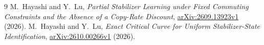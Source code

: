 \documentclass[10pt]{amsart}
\begin{document}
\begin{thebibliography}{9}
M.~Hayashi and Y.~Lu,
\emph{Partial Stabilizer Learning under Fixed Commuting Constraints and the
Absence of a Copy-Rate Discount},
\href{https://arxiv.org/abs/2609.13923}{arXiv:2609.13923v1} (2026).
M.~Hayashi and Y.~Lu,
\emph{Exact Critical Curve for Uniform Stabilizer-State Identification},
\href{https://arxiv.org/abs/2610.00266}{arXiv:2610.00266v1} (2026).
\end{thebibliography}
\end{document}
